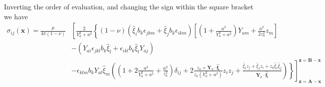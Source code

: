 Inverting the order of evaluation, and changing the sign within the square bracket we have
\begin{align}
\sigma_{ij}(\bm x)
=\frac{\mu}{4\pi(1-\nu)}&\left[\frac{2}{Y_a^2+a^2}\left\{(1-\nu)\left(\hat{\xi}_ib_k\epsilon_{jkm}+\hat{\xi}_jb_k\epsilon_{ikm}\right)\left[\left(1+\frac{a^2}{Y_a^2+a^2}\right)Y_{am}+\frac{a^2}{2z_a^2 }z_m\right]\right.\right.\nonumber\\
&-(Y_{ai}\epsilon_{jkl}b_k\hat{\xi}_l+\epsilon_{ikl}b_k\hat{\xi}_lY_{aj})\nonumber\\
&\left.\left.-\epsilon_{klm}b_kY_{al}\hat{\xi}_m\left(\left(1+2\frac{a^2}{Y_a^2+a^2}+\frac{a^2}{z_a^2 }\right)\delta_{ij}+2\frac{z_a+\bm Y_a\cdot \hat{\bm \xi}}{z_a(Y_a^2+a^2)}z_iz_j+\frac{\hat{\xi}_iz_j+\hat{\xi}_jz_i+z_a\hat{\xi}_i\hat{\xi}_j}{\bm Y_a\cdot \hat{\bm \xi}}\right)
\right\}\right]^{\bm z=\bm B-\bm x}_{\bm z=\bm A-\bm x}
%
\end{align}

